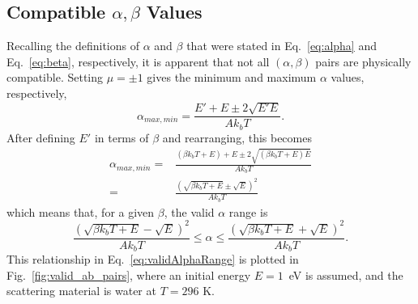 \documentclass[Master.tex]{subfiles}
\begin{document}
  \subsection{Compatible $\alpha,\beta$ Values}
  Recalling the definitions of $\alpha$ and $\beta$ that were stated in Eq.~\ref{eq:alpha} and Eq.~\ref{eq:beta}, respectively, it is apparent that not all $(\alpha,\beta)$ pairs are physically compatible. 
  Setting $\mu=\pm1$ gives the minimum and maximum $\alpha$ values, respectively,
			\begin{equation}
                          \alpha_{max,min}=\frac{E'+E\pm2\sqrt{E'E}}{Ak_bT}.
			\end{equation}
                        After defining $E'$ in terms of $\beta$ and rearranging, this becomes 
			\begin{align}
                          \alpha_{max,min}=&\frac{(\beta k_bT + E) + E \pm 2\sqrt{(\beta k_bT + E)E}}{Ak_bT}\\
                          =&\frac{\left(\sqrt{\beta k_bT + E} \pm\sqrt{E}\right)^2}{Ak_bT}
			\end{align}
                        which means that, for a given $\beta$, the valid $\alpha$ range is 
                        \begin{equation}
                          \frac{\left(\sqrt{\beta k_bT + E} -\sqrt{E}\right)^2}{Ak_bT} \leq \alpha\leq \frac{\left(\sqrt{\beta k_bT + E} +\sqrt{E}\right)^2}{Ak_bT}.\label{eq:validAlphaRange}
                        \end{equation}
                        This relationship in Eq.~\ref{eq:validAlphaRange} is plotted in Fig.~\ref{fig:valid_ab_pairs}, where an initial energy $E=1$~eV is assumed, and the scattering material is water at $T=296$ K.
\end{document}

